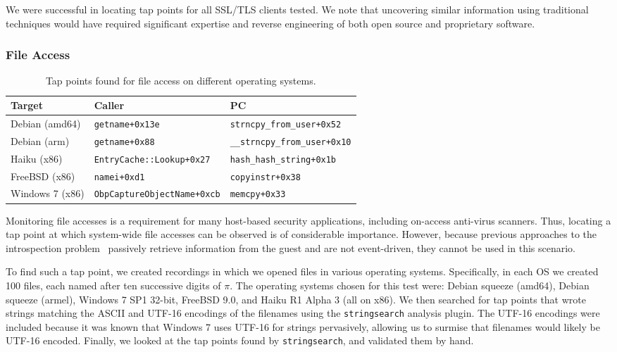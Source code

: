 We were successful in locating tap points for all SSL/TLS clients tested.
We note that uncovering similar information using traditional techniques
would have required significant expertise and reverse engineering of
both open source and proprietary software.

\subsubsection{File Access}
\label{sec:eval:subsec:file}

\begin{table*}
    \centering
    \small
    \begin{tabular}{|l|l|l|}
        \hline
        Target & Caller & PC \\
        \hline
        Debian (amd64) & \texttt{getname+0x13e} & \texttt{strncpy\_from\_user+0x52} \\ 
        Debian (arm) & \texttt{getname+0x88} & \texttt{\_\_strncpy\_from\_user+0x10} \\
        Haiku (x86) & \texttt{EntryCache::Lookup+0x27} & \texttt{hash\_hash\_string+0x1b} \\
        FreeBSD (x86) & \texttt{namei+0xd1} & \texttt{copyinstr+0x38} \\
        Windows 7 (x86) & \texttt{ObpCaptureObjectName+0xcb} & \texttt{memcpy+0x33} \\
        \hline
    \end{tabular}
\caption{Tap points found for file access on different operating systems.}
\label{tbl:file}
\end{table*}

Monitoring file accesses is a requirement for many host-based security
applications, including on-access anti-virus scanners. Thus, locating a
tap point at which system-wide file accesses can be observed is of
considerable importance. However, because previous approaches to the
introspection problem~\cite{Dolan-Gavitt:2011uq,Fu:2012fk} passively
retrieve information from the guest and are not event-driven, they
cannot be used in this scenario.

To find such a tap point, we created recordings in which we opened files
in various operating systems. Specifically, in each OS we created 100
files, each named after ten successive digits of $\pi$. The operating
systems chosen for this test were: Debian squeeze (amd64), Debian
squeeze (armel), Windows 7 SP1 32-bit, FreeBSD 9.0, and Haiku R1 Alpha
3 (all on x86). We then searched for tap points that wrote strings
matching the ASCII and UTF-16 encodings of the filenames using the
\texttt{stringsearch} analysis plugin. The UTF-16 encodings were
included because it was known that Windows 7 uses UTF-16 for strings
pervasively, allowing us to surmise that filenames would likely be
UTF-16 encoded. Finally, we looked at the tap points found by
\texttt{stringsearch}, and validated them by hand.

